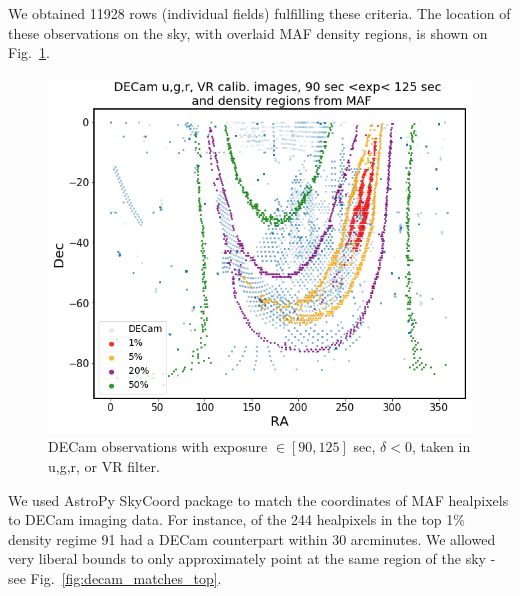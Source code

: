 \documentclass[DM,lsstdraft,toc,usenatbib]{lsstdoc}
\begin{document}
We obtained 11928 rows (individual fields) fulfilling these criteria. The location of these observations on the sky, with overlaid MAF density regions, is shown on Fig.~\ref{fig:decam_regions}. 

 
\begin{figure}
\includegraphics[width=1.0\columnwidth]{figs/Illustrate_density_regions_DECam.png}
\caption{DECam observations with exposure $\in [90,125] $ sec, $\delta < 0$, taken in  u,g,r, or VR filter.  }
\label{fig:decam_regions}
\end{figure} 

We used AstroPy SkyCoord package to match the coordinates of MAF healpixels to DECam imaging data. For instance, of the 244 healpixels in the top 1\% density regime  91 had a DECam counterpart within 30 arcminutes.  We allowed very liberal bounds to only approximately point at the same region of the sky - see Fig.~\ref{fig:decam_matches_top}. 
\end{document}
